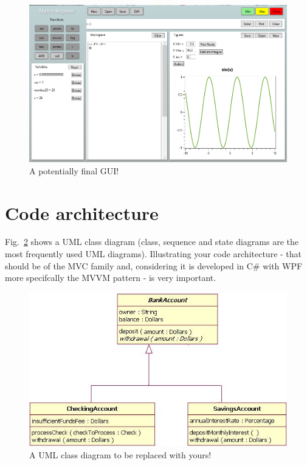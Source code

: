 \documentclass[a4paper, oneside, 11pt]{report}
\begin{document}
\begin{figure}[htb]
\includegraphics[width=0.9 \columnwidth]{GUI_02.png}
\caption{A potentially final GUI!}
\label{gui02}
\end{figure}

\section{Code architecture}

Fig.\ \ref{class} shows a UML class diagram (class, sequence and state diagrams are the most frequently used UML diagrams). Illustrating your code architecture - that should be of the MVC family and, considering it is developed in C\# with WPF more specifcally the MVVM pattern - is very important.

\begin{figure}[htb]
\includegraphics[width=1.0 \columnwidth]{class.png}
\caption{A UML class diagram to be replaced with yours!}
\label{class}
\end{figure}
\end{document}
